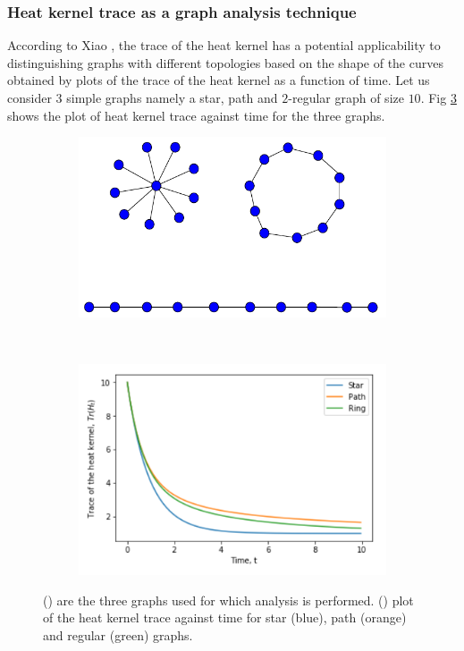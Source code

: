 \documentclass[10pt,a4paper]{article}
\theoremstyle{plain}
\theoremstyle{definition}
\begin{document}
        \subsubsection{Heat kernel trace as a graph analysis technique}
        According to Xiao \citep{xiao2009graph}, the trace of the heat kernel has a potential applicability to distinguishing graphs with different topologies based on the shape of the curves obtained by plots of the trace of the heat kernel as a function of time. Let us consider $3$ simple graphs namely a star, path and $2$-regular graph of size $10$. Fig \ref{distinguishGraphs} shows the plot of heat kernel trace against time for the three graphs.
        
        \begin{figure}[H]
        	\centering
        	\begin{subfigure}[b]{0.45\textwidth}
        		\includegraphics[width= \textwidth]{images/kernel-graphs.pdf}
        		\caption{}
        		\label{kernelgraphs}
        	\end{subfigure}~
        	\begin{subfigure}[b]{0.45\textwidth}
        		\includegraphics[width= \textwidth]{images/Trace-kernel-plot}
        		\caption{}
        		\label{plot-kernel}
        	\end{subfigure}
        	\caption{() are the three graphs used for which analysis is performed. () plot of the heat kernel trace against time for star (blue), path (orange) and regular (green) graphs.}
        	\label{distinguishGraphs}
        \end{figure}
\end{document}
